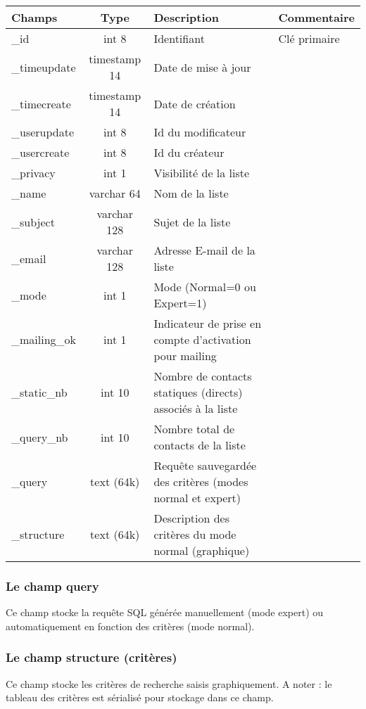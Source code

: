 \begin{tabular}{|p{3cm}|c|p{5.4cm}|p{2.6cm}|}
\hline
\textbf{Champs} & \textbf{Type} & \textbf{Description} & \textbf{Commentaire} \\
\hline
\_id & int 8 & Identifiant & Clé primaire \\
\hline
\_timeupdate & timestamp 14 & Date de mise à jour & \\
\hline
\_timecreate & timestamp 14 & Date de création & \\
\hline
\_userupdate & int 8 & Id du modificateur & \\
\hline
\_usercreate & int 8 & Id du créateur & \\
\hline
\_privacy & int 1 & Visibilité de la liste & \\
\hline
\_name & varchar 64 & Nom de la liste & \\
\hline
\_subject & varchar 128 & Sujet de la liste & \\
\hline
\_email & varchar 128 & Adresse E-mail de la liste & \\
\hline
\_mode & int 1 & Mode (Normal=0 ou Expert=1) & \\
\hline
\_mailing\_ok & int 1 & Indicateur de prise en compte d'activation pour mailing & \\
\hline
\_static\_nb & int 10 & Nombre de contacts statiques (directs) associés à la liste & \\
\hline
\_query\_nb & int 10 & Nombre total de contacts de la liste & \\
\hline
\_query & text (64k) & Requête sauvegardée des critères (modes normal et expert) & \\
\hline
\_structure & text (64k) & Description des critères du mode normal (graphique) &\\
\hline
\end{tabular}


\subsubsection{Le champ query}

Ce champ stocke la requête SQL générée manuellement (mode expert) ou automatiquement en fonction des critères (mode normal).


\subsubsection{Le champ structure (critères)}

Ce champ stocke les critères de recherche saisis graphiquement.
A noter : le tableau des critères est sérialisé pour stockage dans ce champ.



